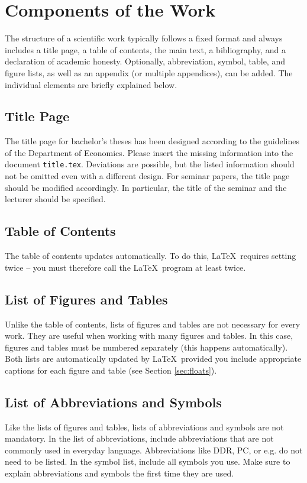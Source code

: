 
\chapter{Components of the Work}

The structure of a scientific work typically follows a fixed format and always includes a title page, a table of contents, the main text, a bibliography, and a declaration of academic honesty. Optionally, abbreviation, symbol, table, and figure lists, as well as an appendix (or multiple appendices), can be added. The individual elements are briefly explained below.

\section{Title Page}
The title page for bachelor's theses has been designed according to the guidelines of the Department of Economics. Please insert the missing information into the document \texttt{title.tex}. Deviations are possible, but the listed information should not be omitted even with a different design. For seminar papers, the title page should be modified accordingly. In particular, the title of the seminar and the lecturer should be specified.

\section{Table of Contents}
The table of contents updates automatically. To do this, \LaTeX\ requires setting twice – you must therefore call the \LaTeX\ program at least twice.

\section{List of Figures and Tables}
Unlike the table of contents, lists of figures and tables are not necessary for every work. They are useful when working with many figures and tables. In this case, figures and tables must be numbered separately (this happens automatically). Both lists are automatically updated by \LaTeX\, provided you include appropriate captions for each figure and table (see Section \ref{sec:floats}).

\section{List of Abbreviations and Symbols}
Like the lists of figures and tables, lists of abbreviations and symbols are not mandatory. In the list of abbreviations, include abbreviations that are not commonly used in everyday language. Abbreviations like DDR, PC, or e.g. do not need to be listed. In the symbol list, include all symbols you use. Make sure to explain abbreviations and symbols the first time they are used.

